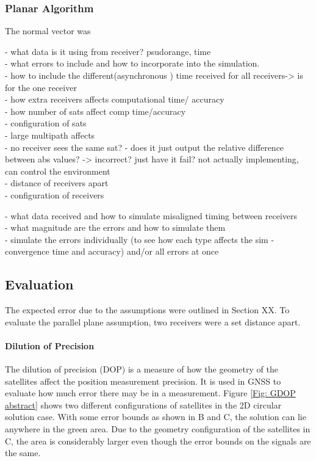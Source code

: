 \documentclass[11pt,a4paper]{article}
\begin{document}
\subsubsection{Planar Algorithm}
The normal vector was


- what data is it using from receiver? psudorange, time\\

- what errors to include and how to incorporate into the simulation.\\
- how to include the different(asynchronous ) time received for all receivers-> is for the one receiver \\
- how extra receivers affects computational time/ accuracy\\
- how number of sats affect comp time/accuracy\\
- configuration of sats\\
- large multipath affects\\
- no receiver sees the same sat? - does it just output the relative difference between abs values? -> incorrect? just have it fail? not actually implementing, can control the environment\\
- distance of receivers apart\\
- configuration of receivers


- what data received and how to simulate misaligned timing between receivers\\
- what magnitude are the errors and how to simulate them\\
- simulate the errors individually (to see how each type affects the sim - convergence time and accuracy) and/or all errors at once


\subsection{Evaluation} %
The expected error due to the assumptions were outlined in Section XX. To evaluate the parallel plane assumption, two receivers were a set distance apart.


\paragraph{Dilution of Precision}
The dilution of precision (DOP) is a measure of how the geometry of the satellites affect the position measurement precision. It is used in GNSS to evaluate how much error there may be in a measurement. Figure \ref{Fig: GDOP abstract} shows two different configurations of satellites in the 2D circular solution case. With some error bounds as shown in B and C, the solution can lie anywhere in the green area. Due to the geometry configuration of the satellites in C, the area is considerably larger even though the error bounds on the signals are the same.
\end{document}
